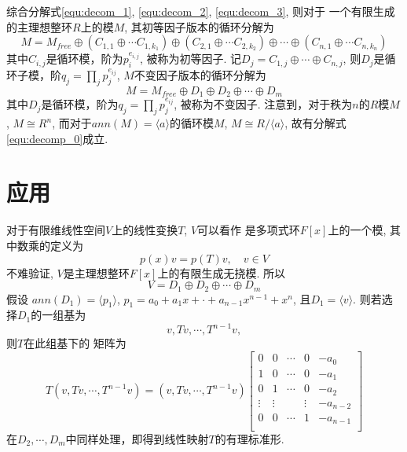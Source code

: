 综合分解式\eqref{equ:decom_1}, \eqref{equ:decom_2}, \eqref{equ:decom_3},
则对于
一个有限生成的主理想整环$R$上的模$M$,
其初等因子版本的循环分解为
\begin{equation}
M = M_{free} 
    \oplus (C_{1,1}\oplus \cdots C_{1,k_1})
    \oplus (C_{2,1}\oplus \cdots C_{2,k_2})
	\oplus \cdots
    \oplus (C_{n,1}\oplus \cdots C_{n,k_n})
\end{equation}
其中$C_{i,j}$是循环模，阶为$p_i^{e_{i,j}}$, 被称为初等因子.
记$D_j = C_{1,j} \oplus \cdots \oplus C_{n,j}$, 
则$D_j$是循环子模，阶$q_j = \prod_{j} p_j^{e_{ij}}$,
$M$不变因子版本的循环分解为
\begin{equation}
M = M_{free} 
    \oplus D_1 
    \oplus D_2 
	\oplus \cdots
    \oplus D_m
\end{equation}
其中$D_j$是循环模，阶为$q_j = \prod_{j} p_j^{e_{ij}}$, 被称为不变因子.
注意到，对于秩为$n$的$R$模$M$, $M \cong R^n$,
而对于$ann(M) = \langle a \rangle$的循环模$M$, $M \cong R/\langle a \rangle$,
故有分解式\eqref{equ:decomp_0}成立.

\section{应用}
对于有限维线性空间$V$上的线性变换$T$, $V$可以看作
是多项式环$F[x]$上的一个模, 其中数乘的定义为
\begin{equation}
\nonumber
p(x)v = p(T)v, \quad v \in V
\end{equation}
不难验证, $V$是主理想整环$F[x]$上的有限生成无挠模.
所以
\begin{equation}
\nonumber
V = D_1 \oplus D_2 \oplus \cdots \oplus D_m
\end{equation}
假设
$ann(D_1) = 
\langle p_1\rangle$,
$p_1 = a_0 + a_1 x + \cdot + a_{n-1} x^{n-1} + x^n$,
且$D_1  = \langle v \rangle$.
则若选择$D_1$的一组基为
$$v, Tv, \cdots, T^{n-1}v,$$
则$T$在此组基下的
矩阵为
\begin{equation}
T(v, Tv, \cdots, T^{n-1}v)
= (v, Tv, \cdots, T^{n-1}v)
\begin{bmatrix}
	0& 0& \cdots &0 & -a_0\\
	1& 0& \cdots &0 & -a_1\\
	0& 1& \cdots &0 & -a_2\\
	\vdots& \vdots& &\vdots& -a_{n-2}\\
	0& 0& \cdots& 1& -a_{n-1}\\
\end{bmatrix}
\end{equation}
在$D_2, \cdots, D_m$中同样处理，即得到线性映射$T$的有理标准形.

